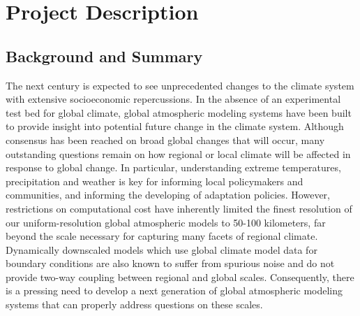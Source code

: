 \documentclass[11pt]{article}
\begin{document}
\appendix

\addtocounter{section}{3}
 
\section{Project Description}

\subsection{Background and Summary}


The next century is expected to see unprecedented changes to the climate system with extensive socioeconomic repercussions.  In the absence of an experimental test bed for global climate, global atmospheric modeling systems have been built to provide insight into potential future change in the climate system.  Although consensus has been reached on broad global changes that will occur, many outstanding questions remain on how regional or local climate will be affected in response to global change.  In particular, understanding extreme temperatures, precipitation and weather is key for informing local policymakers and communities, and informing the developing of adaptation policies.  However, restrictions on computational cost have inherently limited the finest resolution of our uniform-resolution global atmospheric models to 50-100 kilometers, far beyond the scale necessary for capturing many facets of regional climate.  Dynamically downscaled models which use global climate model data for boundary conditions are also known to suffer from spurious noise and do not provide two-way coupling between regional and global scales.  Consequently, there is a pressing need to develop a next generation of global atmospheric modeling systems that can properly address questions on these scales.
\end{document}
